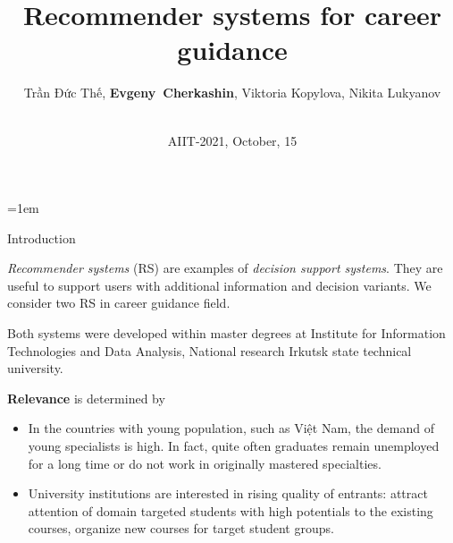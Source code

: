 \documentclass[10pt,dvipsnames]{beamer}
\def\remph#1{\textcolor{Mahogany}{\bfseries #1}}
\begin{document}
\parindent=1em
\title{Recommender systems for career guidance}
\author{
\def\and{, }
Trần Đức Thế\and
\remph{Evgeny~Cherkashin}\and
Viktoria Kopylova\and
Nikita Lukyanov}


\date{${}$\\\vspace{2em}AIIT-2021, October, 15}

\maketitle
\begin{frame}{Introduction}

  \emph{Recommender systems} (RS) are examples of \emph{decision support systems}. They are useful to support users with additional information and decision variants.  We consider two RS in career guidance field.

Both systems were developed within master degrees at Institute for Information Technologies and Data Analysis, National research Irkutsk state technical university.

\textbf{Relevance} is determined by
\begin{itemize}
\item In the countries with young population, such as Việt Nam, the demand of young specialists is high. In fact, quite often graduates remain unemployed for a long time or do not work in originally mastered specialties.
\item University institutions are interested in rising quality of entrants: attract attention of domain targeted students with high potentials to the existing courses, organize new courses for target student groups.
\end{itemize}



\end{frame}
\end{document}
